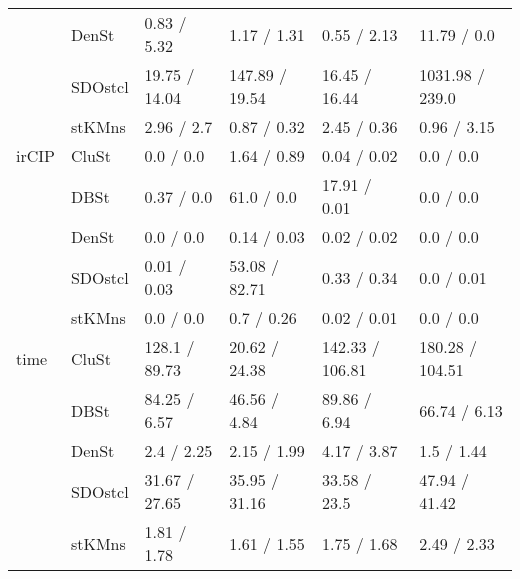 \begin{table}
\begin{tabular}{llllll}
     & DenSt &     0.83 / 5.32 &     1.17 / 1.31 &      0.55 / 2.13 &      11.79 / 0.0 \\
     & SDOstcl &   19.75 / 14.04 &  147.89 / 19.54 &    16.45 / 16.44 &  1031.98 / 239.0 \\
     & stKMns &      2.96 / 2.7 &     0.87 / 0.32 &      2.45 / 0.36 &      0.96 / 3.15 \\
irCIP & CluSt &       0.0 / 0.0 &     1.64 / 0.89 &      0.04 / 0.02 &        0.0 / 0.0 \\
     & DBSt &      0.37 / 0.0 &      61.0 / 0.0 &     17.91 / 0.01 &        0.0 / 0.0 \\
     & DenSt &       0.0 / 0.0 &     0.14 / 0.03 &      0.02 / 0.02 &        0.0 / 0.0 \\
     & SDOstcl &     0.01 / 0.03 &   53.08 / 82.71 &      0.33 / 0.34 &       0.0 / 0.01 \\
     & stKMns &       0.0 / 0.0 &      0.7 / 0.26 &      0.02 / 0.01 &        0.0 / 0.0 \\
time & CluSt &   128.1 / 89.73 &   20.62 / 24.38 &  142.33 / 106.81 &  180.28 / 104.51 \\
     & DBSt &    84.25 / 6.57 &    46.56 / 4.84 &     89.86 / 6.94 &     66.74 / 6.13 \\
     & DenSt &      2.4 / 2.25 &     2.15 / 1.99 &      4.17 / 3.87 &       1.5 / 1.44 \\
     & SDOstcl &   31.67 / 27.65 &   35.95 / 31.16 &     33.58 / 23.5 &    47.94 / 41.42 \\
     & stKMns &     1.81 / 1.78 &     1.61 / 1.55 &      1.75 / 1.68 &      2.49 / 2.33 \\
\bottomrule
\end{tabular}
\end{table}
